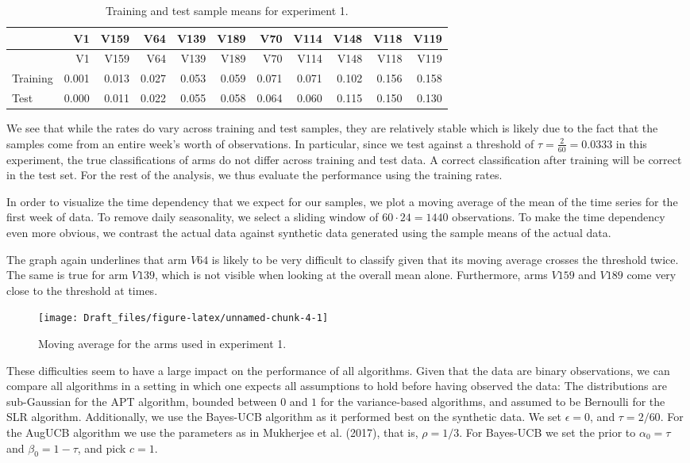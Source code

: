 \documentclass[11pt,]{article}
\begin{document}
\begin{longtable}[]{@{}lrrrrrrrrrr@{}}
\caption{Training and test sample means for experiment
1.}\tabularnewline
\toprule
& V1 & V159 & V64 & V139 & V189 & V70 & V114 & V148 & V118 &
V119\tabularnewline
\midrule
\endfirsthead
\toprule
& V1 & V159 & V64 & V139 & V189 & V70 & V114 & V148 & V118 &
V119\tabularnewline
\midrule
\endhead
Training & 0.001 & 0.013 & 0.027 & 0.053 & 0.059 & 0.071 & 0.071 & 0.102
& 0.156 & 0.158\tabularnewline
Test & 0.000 & 0.011 & 0.022 & 0.055 & 0.058 & 0.064 & 0.060 & 0.115 &
0.150 & 0.130\tabularnewline
\bottomrule
\end{longtable}

We see that while the rates do vary across training and test samples,
they are relatively stable which is likely due to the fact that the
samples come from an entire week's worth of observations. In particular,
since we test against a threshold of \(\tau = \frac{2}{60} = 0.0333\) in
this experiment, the true classifications of arms do not differ across
training and test data. A correct classification after training will be
correct in the test set. For the rest of the analysis, we thus evaluate
the performance using the training rates.

In order to visualize the time dependency that we expect for our
samples, we plot a moving average of the mean of the time series for the
first week of data. To remove daily seasonality, we select a sliding
window of \(60\cdot24 = 1440\) observations. To make the time dependency
even more obvious, we contrast the actual data against synthetic data
generated using the sample means of the actual data.

The graph again underlines that arm \(V64\) is likely to be very
difficult to classify given that its moving average crosses the
threshold twice. The same is true for arm \(V139\), which is not visible
when looking at the overall mean alone. Furthermore, arms \(V159\) and
\(V189\) come very close to the threshold at times.

\begin{figure}

{\centering \texttt{[image: Draft\_files/figure-latex/unnamed-chunk-4-1]} 

}

\caption{Moving average for the arms used in experiment 1.}\label{fig:unnamed-chunk-4}
\end{figure}

These difficulties seem to have a large impact on the performance of all
algorithms. Given that the data are binary observations, we can compare
all algorithms in a setting in which one expects all assumptions to hold
before having observed the data: The distributions are sub-Gaussian for
the APT algorithm, bounded between \(0\) and \(1\) for the
variance-based algorithms, and assumed to be Bernoulli for the SLR
algorithm. Additionally, we use the Bayes-UCB algorithm as it performed
best on the synthetic data. We set \(\epsilon = 0\), and
\(\tau = 2/60\). For the AugUCB algorithm we use the parameters as in
Mukherjee et al. (2017), that is, \(\rho = 1/3\). For Bayes-UCB we set
the prior to \(\alpha_0 = \tau\) and \(\beta_0 = 1-\tau\), and pick
\(c=1\).
\end{document}
